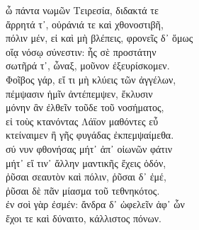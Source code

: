 \documentclass{minimal}
\begin{document}
ὦ πάντα νωμῶν Τειρεσία, διδακτά τε\\
ἄρρητά τ᾽, οὐράνιά τε καὶ χθονοστιβῆ,\\
πόλιν μέν, εἰ καὶ μὴ βλέπεις, φρονεῖς δ᾽ ὅμως\\
οἵᾳ νόσῳ σύνεστιν: ἧς σὲ προστάτην\\
σωτῆρά τ᾽, ὦναξ, μοῦνον ἐξευρίσκομεν.\\
Φοῖβος γάρ, εἴ τι μὴ κλύεις τῶν ἀγγέλων,\\
πέμψασιν ἡμῖν ἀντέπεμψεν, ἔκλυσιν\\
μόνην ἂν ἐλθεῖν τοῦδε τοῦ νοσήματος,\\
εἰ τοὺς κτανόντας Λάϊον μαθόντες εὖ\\
κτείναιμεν ἢ γῆς φυγάδας ἐκπεμψαίμεθα.\\
σύ νυν φθονήσας μήτ᾽ ἀπ᾽ οἰωνῶν φάτιν\\
μήτ᾽ εἴ τιν᾽ ἄλλην μαντικῆς ἔχεις ὁδόν,\\
ῥῦσαι σεαυτὸν καὶ πόλιν, ῥῦσαι δ᾽ ἐμέ,\\
ῥῦσαι δὲ πᾶν μίασμα τοῦ τεθνηκότος.\\
ἐν σοὶ γὰρ ἐσμέν: ἄνδρα δ᾽ ὠφελεῖν ἀφ᾽ ὧν\\
ἔχοι τε καὶ δύναιτο, κάλλιστος πόνων.



 
\end{document}
